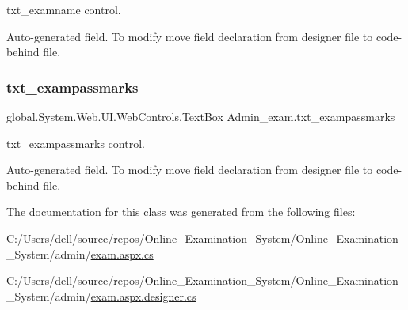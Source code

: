 txt\+\_\+examname control. 

Auto-\/generated field. To modify move field declaration from designer file to code-\/behind file. \mbox{\label{class_admin__exam_aac846d2da109a91c738e315bc4a47ac9}} 
\subsubsection{\texorpdfstring{txt\_exampassmarks}{txt\_exampassmarks}}
{\footnotesize\ttfamily global.\+System.\+Web.\+U\+I.\+Web\+Controls.\+Text\+Box Admin\+\_\+exam.\+txt\+\_\+exampassmarks\hspace{0.3cm}{\ttfamily [protected]}}



txt\+\_\+exampassmarks control. 

Auto-\/generated field. To modify move field declaration from designer file to code-\/behind file. 

The documentation for this class was generated from the following files\+:\begin{DoxyCompactItemize}
\item 
C\+:/\+Users/dell/source/repos/\+Online\+\_\+\+Examination\+\_\+\+System/\+Online\+\_\+\+Examination\+\_\+\+System/admin/\mbox{\hyperlink{exam_8aspx_8cs}{exam.\+aspx.\+cs}}\item 
C\+:/\+Users/dell/source/repos/\+Online\+\_\+\+Examination\+\_\+\+System/\+Online\+\_\+\+Examination\+\_\+\+System/admin/\mbox{\hyperlink{exam_8aspx_8designer_8cs}{exam.\+aspx.\+designer.\+cs}}\end{DoxyCompactItemize}
